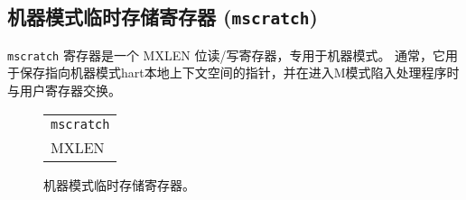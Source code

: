 \subsection{机器模式临时存储寄存器 ({\tt mscratch})}

\iffalse
The {\tt mscratch} register is an MXLEN-bit read/write register
dedicated for use by machine mode.  Typically, it is used to hold a
pointer to a machine-mode hart-local context space and swapped with a
user register upon entry to an M-mode trap handler.
\fi
{\tt mscratch} 寄存器是一个 MXLEN 位读/写寄存器，专用于机器模式。 
通常，它用于保存指向机器模式hart本地上下文空间的指针，并在进入M模式陷入处理程序时与用户寄存器交换。

\begin{figure}[h!]
{\footnotesize
\begin{center}
\begin{tabular}{@{}J}
 \\
\hline
{} \\
\hline
MXLEN \\
\end{tabular}
\end{center}
}
\vspace{-0.1in}
\caption{机器模式临时存储寄存器。}
\label{mscratchreg}
\end{figure}

\iffalse
\begin{commentary}
The MIPS ISA allocated two user registers ({\tt k0}/{\tt k1}) for use
by the operating system.  Although the MIPS scheme provides a fast and
simple implementation, it also reduces available user registers,  and
does not scale to further privilege levels, or nested traps.  It can
also require both registers are cleared before returning to user level
to avoid a potential security hole and to provide deterministic
debugging behavior.

The RISC-V user ISA was designed to support many possible privileged
system environments and so we did not want to infect the user-level
ISA with any OS-dependent features.  The RISC-V CSR swap instructions
can quickly save/restore values to the {\tt mscratch} register.
Unlike the MIPS design, the OS can rely on holding a value in the {\tt
  mscratch} register while the user context is running.
\end{commentary}
\fi

